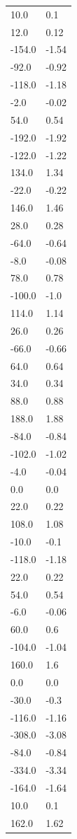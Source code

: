 \begin{longtable}{ll}
10.0 & 0.1 \\
12.0 & 0.12 \\
-154.0 & -1.54 \\
-92.0 & -0.92 \\
-118.0 & -1.18 \\
-2.0 & -0.02 \\
54.0 & 0.54 \\
-192.0 & -1.92 \\
-122.0 & -1.22 \\
134.0 & 1.34 \\
-22.0 & -0.22 \\
146.0 & 1.46 \\
28.0 & 0.28 \\
-64.0 & -0.64 \\
-8.0 & -0.08 \\
78.0 & 0.78 \\
-100.0 & -1.0 \\
114.0 & 1.14 \\
26.0 & 0.26 \\
-66.0 & -0.66 \\
64.0 & 0.64 \\
34.0 & 0.34 \\
88.0 & 0.88 \\
188.0 & 1.88 \\
-84.0 & -0.84 \\
-102.0 & -1.02 \\
-4.0 & -0.04 \\
0.0 & 0.0 \\
22.0 & 0.22 \\
108.0 & 1.08 \\
-10.0 & -0.1 \\
-118.0 & -1.18 \\
22.0 & 0.22 \\
54.0 & 0.54 \\
-6.0 & -0.06 \\
60.0 & 0.6 \\
-104.0 & -1.04 \\
160.0 & 1.6 \\
0.0 & 0.0 \\
-30.0 & -0.3 \\
-116.0 & -1.16 \\
-308.0 & -3.08 \\
-84.0 & -0.84 \\
-334.0 & -3.34 \\
-164.0 & -1.64 \\
10.0 & 0.1 \\
162.0 & 1.62 \\

\end{longtable}
